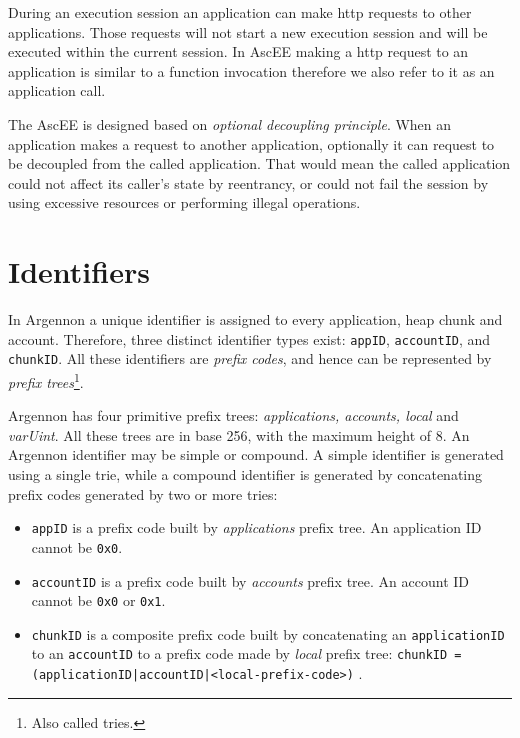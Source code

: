 During an execution session an application can make http requests to other applications. Those requests will not start
a new execution session and will be executed within the current session. In AscEE making a http request to an
application is similar to a function invocation therefore we also refer to it as an application call.

The AscEE is designed based on \emph{optional
decoupling principle}. When an application makes a request to another application, optionally it can request to be
decoupled from the called application. That would mean the called application could not affect its caller's state
by reentrancy, or could not fail the session by using excessive resources or performing illegal operations.


\section{Identifiers}\label{sec:identifiers}

In Argennon a unique identifier is assigned to every application, heap chunk and account. Therefore, three distinct
identifier types exist: \texttt{appID}, \texttt{accountID}, and \texttt{chunkID}.
All these identifiers are \emph{prefix codes}, and hence can be represented by
\emph{prefix trees}\footnote{Also called tries.}.

Argennon has four primitive prefix trees:
\emph{applications, accounts, local} and \emph{varUint}.
All these trees are in base 256, with the maximum height
of 8. An Argennon identifier may be simple or compound. A simple identifier is generated using a single trie, while a
compound identifier is generated by concatenating prefix codes generated by two or more tries:

\begin{itemize}
    \item \texttt{appID} is a prefix code built by \emph{applications} prefix tree. An application ID cannot
    be \texttt{0x0}.

    \item \texttt{accountID} is a prefix code built by \emph{accounts} prefix tree. An account ID cannot
    be \texttt{0x0} or \texttt{0x1}.

    \item \texttt{chunkID} is a composite prefix code built by concatenating an \texttt{applicationID} to
    an \texttt{accountID} to a prefix code made by \emph{local} prefix tree:
    \subitem \texttt{chunkID = (applicationID|accountID|<local-prefix-code>)} .
\end{itemize}


